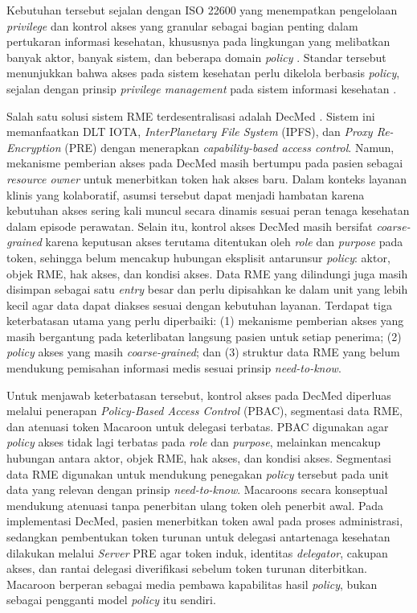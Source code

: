 \documentclass[bahasa, 12pt, a4paper, onecolumn, oneside, final]{report}
\begin{document}
Kebutuhan tersebut sejalan dengan ISO 22600 yang menempatkan pengelolaan \textit{privilege} dan kontrol akses yang granular sebagai bagian penting dalam pertukaran informasi kesehatan, khususnya pada lingkungan yang melibatkan banyak aktor, banyak sistem, dan beberapa domain \textit{policy} \autocite{ISO_22600_2}. Standar tersebut menunjukkan bahwa akses pada sistem kesehatan perlu dikelola berbasis \textit{policy}, sejalan dengan prinsip \textit{privilege management} pada sistem informasi kesehatan \autocite{ISO_22600_2}.

Salah satu solusi sistem RME terdesentralisasi adalah DecMed \autocite{sadewa2025decmed}. Sistem ini memanfaatkan DLT IOTA, \textit{InterPlanetary File System} (IPFS), dan \textit{Proxy Re-Encryption} (PRE) dengan menerapkan \textit{capability-based access control}. Namun, mekanisme pemberian akses pada DecMed masih bertumpu pada pasien sebagai \textit{resource owner} untuk menerbitkan token hak akses baru. Dalam konteks layanan klinis yang kolaboratif, asumsi tersebut dapat menjadi hambatan karena kebutuhan akses sering kali muncul secara dinamis sesuai peran tenaga kesehatan dalam episode perawatan. Selain itu, kontrol akses DecMed masih bersifat \textit{coarse-grained} karena keputusan akses terutama ditentukan oleh \textit{role} dan \textit{purpose} pada token, sehingga belum mencakup hubungan eksplisit antarunsur \textit{policy}: aktor, objek RME, hak akses, dan kondisi akses. Data RME yang dilindungi juga masih disimpan sebagai satu \textit{entry} besar dan perlu dipisahkan ke dalam unit yang lebih kecil agar data dapat diakses sesuai dengan kebutuhan layanan. Terdapat tiga keterbatasan utama yang perlu diperbaiki: (1) mekanisme pemberian akses yang masih bergantung pada keterlibatan langsung pasien untuk setiap penerima; (2) \textit{policy} akses yang masih \textit{coarse-grained}; dan (3) struktur data RME yang belum mendukung pemisahan informasi medis sesuai prinsip \textit{need-to-know}.

Untuk menjawab keterbatasan tersebut, kontrol akses pada DecMed diperluas melalui penerapan \textit{Policy-Based Access Control} (PBAC), segmentasi data RME, dan atenuasi token Macaroon untuk delegasi terbatas. PBAC digunakan agar \textit{policy} akses tidak lagi terbatas pada \textit{role} dan \textit{purpose}, melainkan mencakup hubungan antara aktor, objek RME, hak akses, dan kondisi akses. Segmentasi data RME digunakan untuk mendukung penegakan \textit{policy} tersebut pada unit data yang relevan dengan prinsip \textit{need-to-know}. Macaroons secara konseptual mendukung atenuasi tanpa penerbitan ulang token oleh penerbit awal. Pada implementasi DecMed, pasien menerbitkan token awal pada proses administrasi, sedangkan pembentukan token turunan untuk delegasi antartenaga kesehatan dilakukan melalui \textit{Server} PRE agar token induk, identitas \textit{delegator}, cakupan akses, dan rantai delegasi diverifikasi sebelum token turunan diterbitkan. Macaroon berperan sebagai media pembawa kapabilitas hasil \textit{policy}, bukan sebagai pengganti model \textit{policy} itu sendiri.
\end{document}
